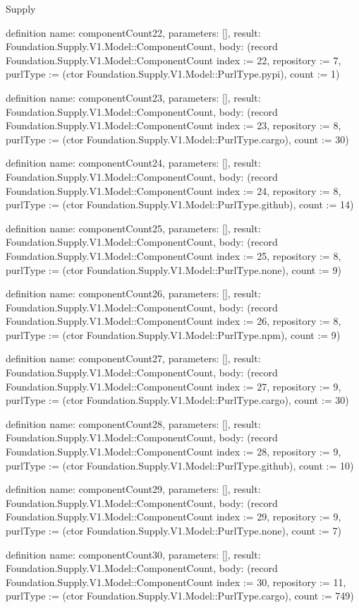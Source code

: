 \begin{lexlean}{Supply}
\begin{semanticmodule}
definition{
  name: componentCount22,
  parameters: [],
  result: Foundation.Supply.V1.Model::ComponentCount,
  body: (record Foundation.Supply.V1.Model::ComponentCount {index := 22, repository := 7, purlType := (ctor Foundation.Supply.V1.Model::PurlType.pypi), count := 1})
}

definition{
  name: componentCount23,
  parameters: [],
  result: Foundation.Supply.V1.Model::ComponentCount,
  body: (record Foundation.Supply.V1.Model::ComponentCount {index := 23, repository := 8, purlType := (ctor Foundation.Supply.V1.Model::PurlType.cargo), count := 30})
}

definition{
  name: componentCount24,
  parameters: [],
  result: Foundation.Supply.V1.Model::ComponentCount,
  body: (record Foundation.Supply.V1.Model::ComponentCount {index := 24, repository := 8, purlType := (ctor Foundation.Supply.V1.Model::PurlType.github), count := 14})
}

definition{
  name: componentCount25,
  parameters: [],
  result: Foundation.Supply.V1.Model::ComponentCount,
  body: (record Foundation.Supply.V1.Model::ComponentCount {index := 25, repository := 8, purlType := (ctor Foundation.Supply.V1.Model::PurlType.none), count := 9})
}

definition{
  name: componentCount26,
  parameters: [],
  result: Foundation.Supply.V1.Model::ComponentCount,
  body: (record Foundation.Supply.V1.Model::ComponentCount {index := 26, repository := 8, purlType := (ctor Foundation.Supply.V1.Model::PurlType.npm), count := 9})
}

definition{
  name: componentCount27,
  parameters: [],
  result: Foundation.Supply.V1.Model::ComponentCount,
  body: (record Foundation.Supply.V1.Model::ComponentCount {index := 27, repository := 9, purlType := (ctor Foundation.Supply.V1.Model::PurlType.cargo), count := 30})
}

definition{
  name: componentCount28,
  parameters: [],
  result: Foundation.Supply.V1.Model::ComponentCount,
  body: (record Foundation.Supply.V1.Model::ComponentCount {index := 28, repository := 9, purlType := (ctor Foundation.Supply.V1.Model::PurlType.github), count := 10})
}

definition{
  name: componentCount29,
  parameters: [],
  result: Foundation.Supply.V1.Model::ComponentCount,
  body: (record Foundation.Supply.V1.Model::ComponentCount {index := 29, repository := 9, purlType := (ctor Foundation.Supply.V1.Model::PurlType.none), count := 7})
}

definition{
  name: componentCount30,
  parameters: [],
  result: Foundation.Supply.V1.Model::ComponentCount,
  body: (record Foundation.Supply.V1.Model::ComponentCount {index := 30, repository := 11, purlType := (ctor Foundation.Supply.V1.Model::PurlType.cargo), count := 749})
}


\end{semanticmodule}
\end{lexlean}
